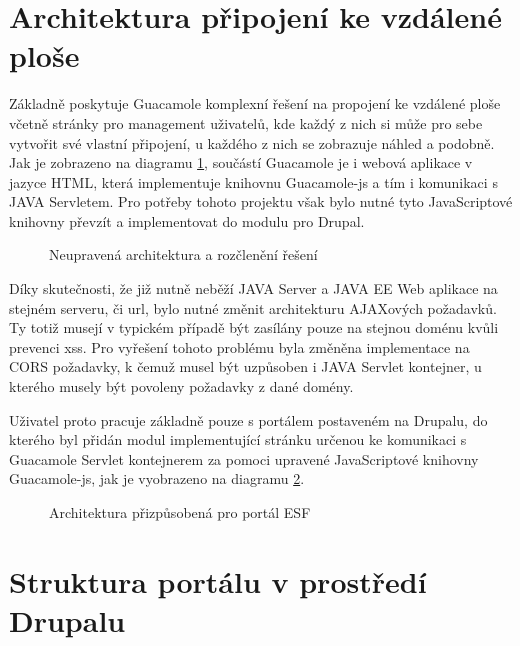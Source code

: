 \section{Architektura připojení ke vzdálené ploše}
Základně poskytuje Guacamole komplexní řešení na propojení ke vzdálené ploše včetně stránky pro management uživatelů, kde každý z nich si může pro sebe vytvořit své vlastní připojení, u každého z nich se zobrazuje náhled a podobně. Jak je zobrazeno na diagramu \ref{fig:arch_guacamole}, součástí Guacamole je i webová aplikace v jazyce HTML, která implementuje knihovnu Guacamole-js a tím i komunikaci s JAVA Servletem. Pro potřeby tohoto projektu však bylo nutné tyto JavaScriptové knihovny převzít a implementovat do modulu pro Drupal. 

\begin{figure}[htp] 
  \caption{Neupravená architektura a rozčlenění řešení}
  \label{fig:arch_guacamole}
\end{figure}  

Díky skutečnosti, že již nutně neběží JAVA Server a JAVA EE Web aplikace na stejném serveru, či url, bylo nutné změnit architekturu AJAXových požadavků. Ty totiž musejí v typickém případě být zasílány pouze na stejnou doménu kvůli prevenci \gls{xss}. Pro vyřešení tohoto problému byla změněna implementace na CORS požadavky, k čemuž musel být uzpůsoben i JAVA Servlet kontejner, u kterého musely být povoleny požadavky z dané domény. 

Uživatel proto pracuje základně pouze s portálem postaveném na Drupalu, do kterého byl přidán modul implementující stránku určenou ke komunikaci s Guacamole Servlet kontejnerem za pomoci upravené JavaScriptové knihovny Guacamole-js, jak je vyobrazeno na diagramu \ref{fig:arch_drupal}.

\begin{figure}[htp] 
  \caption{Architektura přizpůsobená pro portál ESF}
  \label{fig:arch_drupal}
\end{figure}  

\section{Struktura portálu v prostředí Drupalu}

